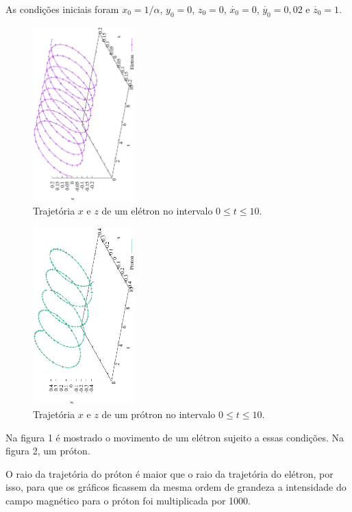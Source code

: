 \documentclass[brazilian, 12pt, a4paper, final]{article}
\begin{document}
\begin{multicols*}{2}
As condições iniciais foram $x_0=1/\alpha$, $y_0=0$, $z_0=0$, $\dot{x_0}=0$, $\dot{y_0}=0,02$ e $\dot{z_0}=1$.

\begin{figure}[H]
  \centering
 \includegraphics[width=0.35\textwidth,angle=-90]{figuras/eLorentz.eps}
  \caption{Trajetória $x$ e $z$ de um elétron no intervalo $0\le t \le 10 $.}
\end{figure}

\begin{figure}[H]
  \centering
 \includegraphics[width=0.35\textwidth,angle=-90]{figuras/pLorentz.eps}
  \caption{Trajetória $x$ e $z$ de um prótron no intervalo $0\le t \le 10 $.}
\end{figure}

Na figura 1 é mostrado o movimento de um elétron sujeito a essas condições. Na figura 2, um próton. 

O raio da trajetória do próton é maior que o raio da trajetória do elétron, por isso, para que os gráficos ficassem da mesma ordem de grandeza a intensidade do campo magnético para o próton foi multiplicada por 1000. 


\end{multicols*}
\end{document}

